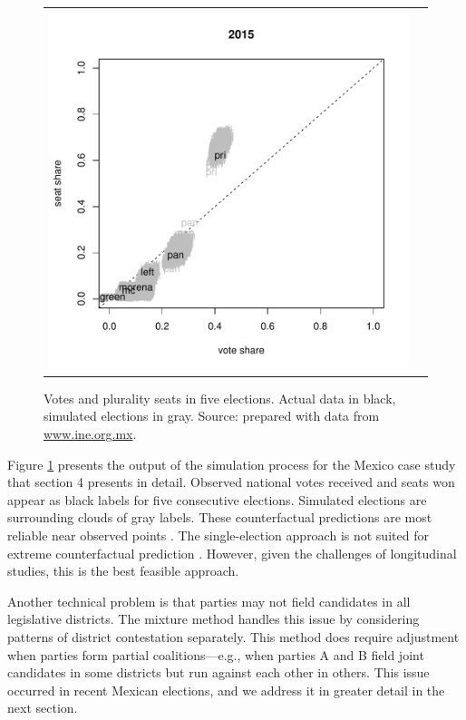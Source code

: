 \documentclass[letter,12pt]{article}
\begin{document}
\begin{figure}
\begin{center}
\begin{tabular}{cc}
    \includegraphics[width=.4\columnwidth]{vs2015.pdf} & \\
\end{tabular}
\caption{Votes and plurality seats in five elections. Actual data in black, simulated elections in gray. Source: prepared with data from \url{www.ine.org.mx}.}\label{F:singleYrSeatsVotes}
\end{center}
\end{figure}

Figure \ref{F:singleYrSeatsVotes} presents the output of the simulation process for the Mexico case study that section 4 presents in detail. Observed national votes received and seats won appear as black labels for five consecutive elections. Simulated elections are surrounding clouds of gray labels. These counterfactual predictions are most reliable near observed points \citep[about $\pm5$ percent,][:fn.\ 8]{linzerSeatVoteElasticity2012}. The single-election approach is not suited for extreme counterfactual prediction \citep[something generally true for any approach,][]{gelman.king.1994EvalElSysRedis}. However, given the challenges of longitudinal studies, this is the best feasible approach.


Another technical problem is that parties may not field candidates in all legislative districts. The mixture method handles this issue by considering patterns of district contestation separately. This method does require adjustment when parties form partial coalitions---e.g., when parties A and B field joint candidates in some districts but run against each other in others. This issue occurred in recent Mexican elections, and we address it in greater detail in the next section. 
\end{document}
